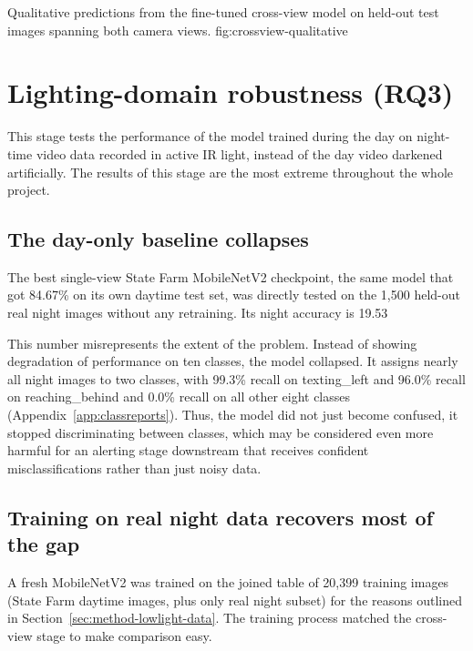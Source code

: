 {Qualitative predictions from the fine-tuned cross-view model on held-out test images spanning both camera views.}
{fig:crossview-qualitative}

\FloatBarrier

\section{Lighting-domain robustness (RQ3)}
\label{sec:qr-lowlight}

This stage tests the performance of the model trained during the day on night-time video data recorded in active IR light, instead of the day video darkened artificially. The results of this stage are the most extreme throughout the whole project.

\subsection{The day-only baseline collapses}

The best single-view State Farm MobileNetV2 checkpoint, the same model that got 84.67\% on its own daytime test set, was directly tested  on the 1,500 held-out real night images without any retraining. Its night accuracy is 19.53%

This number misrepresents the extent of the problem. Instead of showing degradation of performance on ten classes, the model collapsed. It assigns nearly all night images to two classes, with 99.3\% recall on texting\_left and 96.0\% recall on reaching\_behind and 0.0\% recall on all other eight classes (Appendix~\ref{app:classreports}). Thus, the model did not just become confused, it stopped discriminating between classes, which may be considered even more harmful for an alerting stage downstream that receives confident misclassifications rather than just noisy data.


\subsection{Training on real night data recovers most of the gap}

A fresh MobileNetV2 was trained on the joined table of 20,399 training images (State Farm daytime images, plus only real night subset) for the reasons outlined in Section~\ref{sec:method-lowlight-data}. The training process matched the cross-view stage to make comparison easy.

